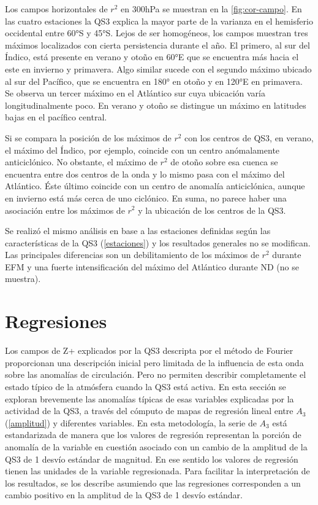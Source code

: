 \documentclass[spanish,a4paper,12pt,oneside]{book}
\begin{document}
Los campos horizontales de \(r^2\) en 300hPa se muestran en la
\autoref{fig:cor-campo}. En las cuatro estaciones la QS3 explica la
mayor parte de la varianza en el hemisferio occidental entre 60°S y
45°S. Lejos de ser homogéneos, los campos muestran tres máximos
localizados con cierta persistencia durante el año. El primero, al sur
del Índico, está presente en verano y otoño en 60°E que se encuentra más
hacia el este en invierno y primavera. Algo similar sucede con el
segundo máximo ubicado al sur del Pacífico, que se encuentra en 180° en
otoño y en 120°E en primavera. Se observa un tercer máximo en el
Atlántico sur cuya ubicación varía longitudinalmente poco. En verano y
otoño se distingue un máximo en latitudes bajas en el pacífico central.

Si se compara la posición de los máximos de \(r^2\) con los centros de
QS3, en verano, el máximo del Índico, por ejemplo, coincide con un
centro anómalamente anticiclónico. No obstante, el máximo de \(r^2\) de
otoño sobre esa cuenca se encuentra entre dos centros de la onda y lo
mismo pasa con el máximo del Atlántico. Éste último coincide con un
centro de anomalía anticiclónica, aunque en invierno está más cerca de
uno ciclónico. En suma, no parece haber una asociación entre los máximos
de \(r^2\) y la ubicación de los centros de la QS3.

Se realizó el mismo análisis en base a las estaciones definidas según
las características de la QS3 (\autoref{estaciones}) y los resultados
generales no se modifican. Las principales diferencias son un
debilitamiento de los máximos de \(r^2\) durante EFM y una fuerte
intensificación del máximo del Atlántico durante ND (no se muestra).

\section{Regresiones}\label{regresiones}

Los campos de Z+ explicados por la QS3 descripta por el método de
Fourier proporcionan una descripción inicial pero limitada de la
influencia de esta onda sobre las anomalías de circulación. Pero no
permiten describir completamente el estado típico de la atmósfera cuando
la QS3 está activa. En esta sección se exploran brevemente las anomalías
típicas de esas variables explicadas por la actividad de la QS3, a
través del cómputo de mapas de regresión lineal entre \(A_3\)
(\autoref{amplitud}) y diferentes variables. En esta metodología, la
serie de \(A_3\) está estandarizada de manera que los valores de
regresión representan la porción de anomalía de la variable en cuestión
asociado con un cambio de la amplitud de la QS3 de 1 desvío estándar de
magnitud. En ese sentido los valores de regresión tienen las unidades de
la variable regresionada. Para facilitar la interpretación de los
resultados, se los describe asumiendo que las regresiones corresponden a
un cambio positivo en la amplitud de la QS3 de 1 desvío estándar.
\end{document}
